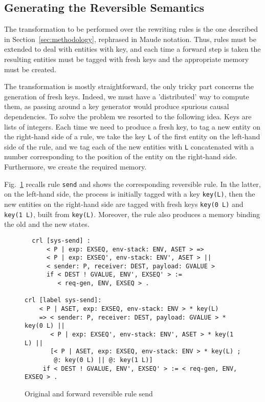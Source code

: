 \documentclass{article}[12pt,a4paper]
\theoremstyle{definition}
\begin{document}
\subsection{Generating the Reversible Semantics}
The transformation to be performed over the rewriting rules is the one
described in Section~\ref{sec:methodology}, rephrased in Maude
notation. Thus, rules must be extended to deal with entities with key,
and each time a forward step is taken the resulting entities must
be tagged with fresh keys and the appropriate memory must be created.

The transformation is mostly straightforward, the only tricky part
concerns the generation of fresh keys. Indeed, we must have a
'distributed' way to compute them, as passing around a key generator
would produce spurious causal dependencies. To solve the problem we
resorted to the following idea. Keys are lists of integers. Each time
we need to produce a fresh key, to tag a new entity on the right-hand
side of a rule, we take the key \verb-L- of the first entity on the
left-hand side of the rule, and we tag each of the new entities with
\verb-L- concatenated with a number corresponding to the position of
the entity on the right-hand side.
Furthermore, we create the
required memory.

Fig.~\ref{fig:revsend} recalls rule \verb_send_ and shows the
corresponding reversible rule. In the latter, on the left-hand side,
the process is initially tagged with a key \verb_key(L)_, then the new
entities on the right-hand side are tagged with fresh keys \verb_key(0 L)_
and \verb_key(1 L)_, built from \verb_key(L)_. Moreover, the rule also
produces a memory binding the old and the new states.

\begin{figure}[t]
  \centering
\begin{verbatim}
  crl [sys-send] :
      < P | exp: EXSEQ, env-stack: ENV, ASET > =>
      < P | exp: EXSEQ', env-stack: ENV', ASET > ||
      < sender: P, receiver: DEST, payload: GVALUE >
      if < DEST ! GVALUE, ENV', EXSEQ' > :=
         < req-gen, ENV, EXSEQ > .

crl [label sys-send]:
    < P | ASET, exp: EXSEQ, env-stack: ENV > * key(L)
    => < sender: P, receiver: DEST, payload: GVALUE > * key(0 L) || 
       < P | exp: EXSEQ', env-stack: ENV', ASET > * key(1 L) || 
       [< P | ASET, exp: EXSEQ, env-stack: ENV > * key(L) ;
        @: key(0 L) || @: key(1 L)]
     if < DEST ! GVALUE, ENV', EXSEQ' > := < req-gen, ENV, EXSEQ > .
\end{verbatim}
  \caption{Original and forward reversible rule send}
  \label{fig:revsend}
\end{figure}
\end{document}
